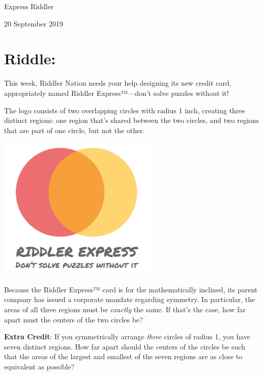 \documentclass{article}
\begin{document}
\pagestyle{empty} %

\begin{center}
{\LARGE Express Riddler}

\vspace{0.15in}

{\Large 20 September 2019}
\end{center}


\section*{Riddle:}

This week, Riddler Nation needs your help designing its new credit card, appropriately named Riddler Express™---don't solve puzzles without it!

The logo consists of two overlapping circles with radius 1 inch, creating three distinct regions: one region that's shared between the two circles, and two regions that are part of one circle, but not the other.

\begin{center}
\includegraphics[width=3in]{Riddler_express_card.png}
\end{center}

Because the Riddler Express™ card is for the mathematically inclined, its parent company has issued a corporate mandate regarding symmetry.
In particular, the areas of all three regions must be \textit{exactly} the same.
If that's the case, how far apart must the centers of the two circles be?

\textbf{Extra Credit}: If you symmetrically arrange \textit{three} circles of radius 1, you have seven distinct regions.
How far apart should the centers of the circles be such that the areas of the largest and smallest of the seven regions are as close to equivalent as possible?
\end{document}
